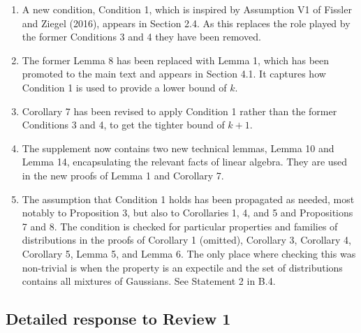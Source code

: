 \documentclass[a4paper]{article}
\begin{document}
\begin{enumerate}

\item A new condition, Condition 1, which is inspired by Assumption V1 of Fissler and Ziegel (2016), appears in Section 2.4.  As this replaces the role played by the former Conditions 3 and 4 they have been removed.

\item The former Lemma 8 has been replaced with Lemma 1, which has been promoted to the main text and appears in Section 4.1.  It captures how Condition 1 is used to provide a lower bound of $k$.

\item Corollary 7 has been revised to apply Condition 1 rather than the former Conditions 3 and 4, to get the tighter bound of $k+1$.

\item The supplement now contains two new technical lemmas, Lemma 10 and Lemma 14, encapsulating the relevant facts of linear algebra.  They are used in the new proofs of Lemma 1 and Corollary 7.

\item The assumption that Condition 1 holds has been propagated as needed, most notably to Proposition 3, but also to Corollaries 1, 4, and 5 and Propositions 7 and 8.  The condition is checked for particular properties and families of distributions in the proofs of Corollary 1 (omitted), Corollary 3, Corollary 4, Corollary 5,  Lemma 5, and Lemma 6.  The only place where checking this was non-trivial is when the property is an expectile and the set of distributions contains all mixtures of Gaussians.  See Statement 2 in B.4.
\end{enumerate}


\subsection*{Detailed response to Review 1}
\end{document}
